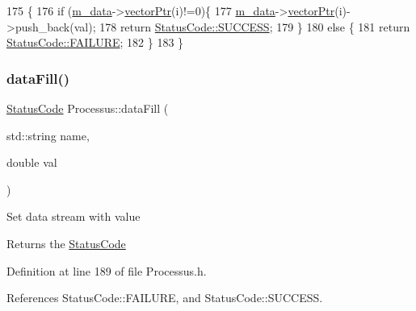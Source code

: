 \begin{DoxyCode}
175                                         \{
176     \textcolor{keywordflow}{if} (\hyperlink{classProcessus_a3da9a9de8af54e2f47807a3e09dfccff}{m\_data}->\hyperlink{classData_aa2153cb57f6f1a67b54eafe5582e0b6b}{vectorPtr}(i)!=0)\{
177       \hyperlink{classProcessus_a3da9a9de8af54e2f47807a3e09dfccff}{m\_data}->\hyperlink{classData_aa2153cb57f6f1a67b54eafe5582e0b6b}{vectorPtr}(i)->push\_back(val);
178       \textcolor{keywordflow}{return} \hyperlink{classStatusCode_a6f565cbeadc76d14c72f047e5e85eb4badd0da38d3ba0d922efd1f4619bc37ad8}{StatusCode::SUCCESS};
179     \}
180     \textcolor{keywordflow}{else} \{
181       \textcolor{keywordflow}{return} \hyperlink{classStatusCode_a6f565cbeadc76d14c72f047e5e85eb4ba3da73d4c469762eb9d3c960368252b26}{StatusCode::FAILURE};
182     \}
183   \}
\end{DoxyCode}
\mbox{\label{classProcessus_aa31ab71711f7af6a729441ff573f69c9}} 
\subsubsection{\texorpdfstring{data\+Fill()}{dataFill()}\hspace{0.1cm}{\footnotesize\ttfamily [2/2]}}
{\footnotesize\ttfamily \hyperlink{classStatusCode}{Status\+Code} Processus\+::data\+Fill (\begin{DoxyParamCaption}\item[{std\+::string}]{name,  }\item[{double}]{val }\end{DoxyParamCaption})\hspace{0.3cm}{\ttfamily [inline]}}

Set data stream with value \begin{DoxyReturn}{Returns}
the \hyperlink{classStatusCode}{Status\+Code} 
\end{DoxyReturn}


Definition at line 189 of file Processus.\+h.



References Status\+Code\+::\+F\+A\+I\+L\+U\+RE, and Status\+Code\+::\+S\+U\+C\+C\+E\+SS.


